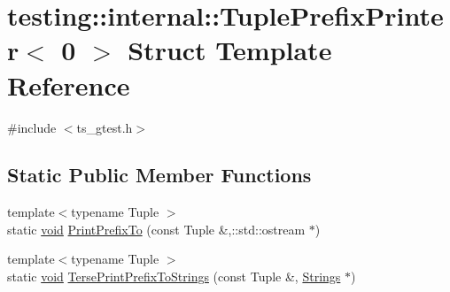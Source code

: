 \hypertarget{structtesting_1_1internal_1_1TuplePrefixPrinter_3_010_01_4}{\section{testing\-:\-:internal\-:\-:Tuple\-Prefix\-Printer$<$ 0 $>$ Struct Template Reference}
\label{structtesting_1_1internal_1_1TuplePrefixPrinter_3_010_01_4}
}


{\ttfamily \#include $<$ts\-\_\-gtest.\-h$>$}

\subsection*{Static Public Member Functions}
\begin{DoxyCompactItemize}
\item 
{\footnotesize template$<$typename Tuple $>$ }\\static \hyperlink{legacy_8hpp_a8bb47f092d473522721002c86c13b94e}{void} \hyperlink{structtesting_1_1internal_1_1TuplePrefixPrinter_3_010_01_4_a80ebc4ff2edc7e7626fe7354e109dca2}{Print\-Prefix\-To} (const Tuple \&,\-::std\-::ostream $\ast$)
\item 
{\footnotesize template$<$typename Tuple $>$ }\\static \hyperlink{legacy_8hpp_a8bb47f092d473522721002c86c13b94e}{void} \hyperlink{structtesting_1_1internal_1_1TuplePrefixPrinter_3_010_01_4_a634e1811ae45ef3f02e3559a5c28e999}{Terse\-Print\-Prefix\-To\-Strings} (const Tuple \&, \hyperlink{namespacetesting_1_1internal_a7706b17f05f4b49e351b052ae4e05073}{Strings} $\ast$)
\end{DoxyCompactItemize}


